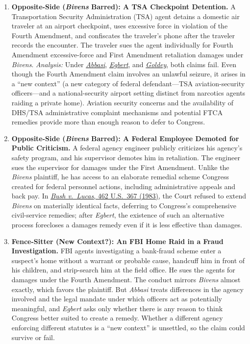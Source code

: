 \documentclass[12pt]{article}
\begin{document}
\begin{enumerate}
\item \textbf{Opposite-Side (\textit{Bivens} Barred): A TSA Checkpoint Detention.} A Transportation Security Administration (TSA) agent detains a domestic air traveler at an airport checkpoint, uses excessive force in violation of the Fourth Amendment, and confiscates the traveler's phone after the traveler records the encounter. The traveler sues the agent individually for Fourth Amendment excessive-force and First Amendment retaliation damages under \textit{Bivens}. \textit{Analysis:} Under \href{https://supreme.justia.com/cases/federal/us/582/15-1358/}{\textit{Abbasi}}, \href{https://supreme.justia.com/cases/federal/us/596/21-147/}{\textit{Egbert}}, and \href{https://supreme.justia.com/cases/federal/us/606/24-809/}{\textit{Goldey}}, both claims fail. Even though the Fourth Amendment claim involves an unlawful seizure, it arises in a ``new context'' (a new category of federal defendant---TSA aviation-security officers---and a national-security airport setting distinct from narcotics agents raiding a private home). Aviation security concerns and the availability of DHS/TSA administrative complaint mechanisms and potential FTCA remedies provide more than enough reason to defer to Congress.

\item \textbf{Opposite-Side (\textit{Bivens} Barred): A Federal Employee Demoted for Public Criticism.} A federal agency engineer publicly criticizes his agency's safety program, and his supervisor demotes him in retaliation. The engineer sues the supervisor for damages under the First Amendment. Unlike the \textit{Bivens} plaintiff, he has access to an elaborate remedial scheme Congress created for federal personnel actions, including administrative appeals and back pay. In \href{https://supreme.justia.com/cases/federal/us/462/367/}{\textit{Bush v.\ Lucas}, 462 U.S.\ 367 (1983)}, the Court refused to extend \textit{Bivens} on materially identical facts, deferring to Congress's comprehensive civil-service remedies; after \textit{Egbert}, the existence of such an alternative process forecloses a damages remedy even if it is less effective than damages.

\item \textbf{Fence-Sitter (New Context?): An FBI Home Raid in a Fraud Investigation.} FBI agents investigating a bank-fraud scheme enter a suspect's home without a warrant or probable cause, handcuff him in front of his children, and strip-search him at the field office. He sues the agents for damages under the Fourth Amendment. The conduct mirrors \textit{Bivens} almost exactly, which favors the plaintiff. But \textit{Abbasi} treats differences in the agency involved and the legal mandate under which officers act as potentially meaningful, and \textit{Egbert} asks only whether there is any reason to think Congress better suited to create a remedy. Whether a different agency enforcing different statutes is a ``new context'' is unsettled, so the claim could survive or fail.

\end{enumerate}
\end{document}
